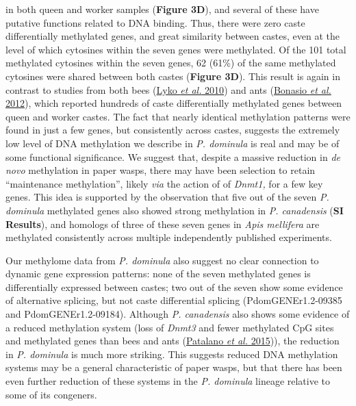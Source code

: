 \documentclass[]{article}
\begin{document}
in both queen and worker samples (\textbf{Figure 3D}), and several of
these have putative functions related to DNA binding. Thus, there were
zero caste differentially methylated genes, and great similarity between
castes, even at the level of which cytosines within the seven genes were
methylated. Of the 101 total methylated cytosines within the seven
genes, 62 (61\%) of the same methylated cytosines were shared between
both castes (\textbf{Figure 3D}). This result is again in contrast to
studies from both bees (\protect\hyperlink{ux5fENREFux5f33}{Lyko
\emph{et al.} 2010}) and ants
(\protect\hyperlink{ux5fENREFux5f4}{Bonasio \emph{et al.} 2012}), which
reported hundreds of caste differentially methylated genes between queen
and worker castes. The fact that nearly identical methylation patterns
were found in just a few genes, but consistently across castes, suggests
the extremely low level of DNA methylation we describe in \emph{P.
dominula} is real and may be of some functional significance. We suggest
that, despite a massive reduction in \emph{de novo} methylation in paper
wasps, there may have been selection to retain ``maintenance
methylation'', likely \emph{via} the action of of \emph{Dnmt1,} for a
few key genes. This idea is supported by the observation that five out
of the seven \emph{P. dominula} methylated genes also showed strong
methylation in \emph{P. canadensis} (\textbf{SI Results}), and homologs
of three of these seven genes in \emph{Apis mellifera} are methylated
consistently across multiple independently published experiments.

Our methylome data from \emph{P. dominula} also suggest no clear
connection to dynamic gene expression patterns: none of the seven
methylated genes is differentially expressed between castes; two out of
the seven show some evidence of alternative splicing, but not caste
differential splicing (PdomGENEr1.2-09385 and PdomGENEr1.2-09184).
Although \emph{P. canadensis} also shows some evidence of a reduced
methylation system (loss of \emph{Dnmt3} and fewer methylated CpG sites
and methylated genes than bees and ants
(\protect\hyperlink{ux5fENREFux5f43}{Patalano \emph{et al.} 2015})), the
reduction in \emph{P. dominula} is much more striking. This suggests
reduced DNA methylation systems may be a general characteristic of paper
wasps, but that there has been even further reduction of these systems
in the \emph{P. dominula} lineage relative to some of its congeners.
\end{document}
